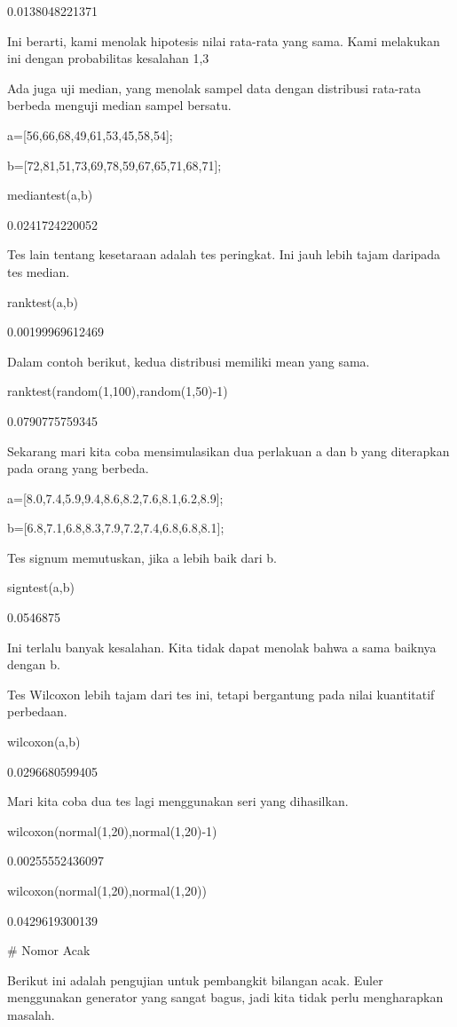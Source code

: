 \documentclass{article}
\begin{document}
    0.0138048221371

Ini berarti, kami menolak hipotesis nilai rata-rata yang sama. Kami
melakukan ini dengan probabilitas kesalahan 1,3%


Ada juga uji median, yang menolak sampel data dengan distribusi
rata-rata berbeda menguji median sampel bersatu.


\>a=[56,66,68,49,61,53,45,58,54];

\>b=[72,81,51,73,69,78,59,67,65,71,68,71];

\>mediantest(a,b)


    0.0241724220052

Tes lain tentang kesetaraan adalah tes peringkat. Ini jauh lebih tajam
daripada tes median.


\>ranktest(a,b)


    0.00199969612469

Dalam contoh berikut, kedua distribusi memiliki mean yang sama.


\>ranktest(random(1,100),random(1,50)-1)


    0.0790775759345

Sekarang mari kita coba mensimulasikan dua perlakuan a dan b yang
diterapkan pada orang yang berbeda.


\>a=[8.0,7.4,5.9,9.4,8.6,8.2,7.6,8.1,6.2,8.9];

\>b=[6.8,7.1,6.8,8.3,7.9,7.2,7.4,6.8,6.8,8.1];


Tes signum memutuskan, jika a lebih baik dari b.


\>signtest(a,b)


    0.0546875

Ini terlalu banyak kesalahan. Kita tidak dapat menolak bahwa a sama
baiknya dengan b.


Tes Wilcoxon lebih tajam dari tes ini, tetapi bergantung pada nilai
kuantitatif perbedaan.


\>wilcoxon(a,b)


    0.0296680599405

Mari kita coba dua tes lagi menggunakan seri yang dihasilkan.


\>wilcoxon(normal(1,20),normal(1,20)-1)


    0.00255552436097

\>wilcoxon(normal(1,20),normal(1,20))


    0.0429619300139

# Nomor Acak

Berikut ini adalah pengujian untuk pembangkit bilangan acak. Euler
menggunakan generator yang sangat bagus, jadi kita tidak perlu
mengharapkan masalah.
\end{document}
